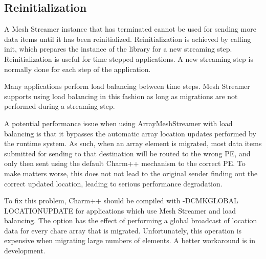 




\subsection{Reinitialization}

A Mesh Streamer instance that has terminated cannot be used for
sending more data items until it has been
reinitialized. Reinitialization is achieved by calling init, which
prepares the instance of the library for a new streaming
step. Reinitialization is useful for time stepped applications. A new
streaming step is normally done for each step of the application.

Many applications perform load balancing between time steps. Mesh
Streamer supports using load balancing in this fashion as long as
migrations are not performed during a streaming step.

A potential performance issue when using ArrayMeshStreamer with load
balancing is that it bypasses the automatic array location updates
performed by the runtime system. As such, when an array element is
migrated, most data items submitted for sending to that destination
will be routed to the wrong PE, and only then sent using the default
Charm++ mechanism to the correct PE. To make matters worse, this does
not not lead to the original sender finding out the correct updated
location, leading to serious performance degradation. 




To fix this problem, Charm++ should be compiled with
-DCMK\underline{\hspace{.2cm}}GLOBAL
\underline{\hspace{.2cm}}LOCATION\underline{\hspace{.2cm}}UPDATE for
applications which use Mesh Streamer and load balancing. The option
has the effect of performing a global broadcast of location data for
every chare array that is migrated. Unfortunately, this operation is
expensive when migrating large numbers of elements. A better workaround
is in development. 


\thispagestyle{empty}
\pagestyle{empty}

%
